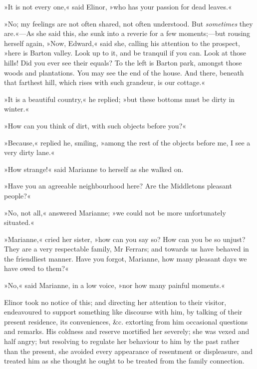 »It is not every one,« said Elinor, »who has your passion for dead leaves.«

»No; my feelings are not often shared, not often understood. But \textit{sometimes} they are.«—As she said this, she sunk into a reverie for a few moments;—but rousing herself again, »Now, Edward,« said she, calling his attention to the prospect, »here is Barton valley. Look up to it, and be tranquil if you can. Look at those hills! Did you ever see their equals? To the left is Barton park, amongst those woods and plantations. You may see the end of the house. And there, beneath that farthest hill, which rises with such grandeur, is our cottage.«

»It is a beautiful country,« he replied; »but these bottoms must be dirty in winter.«

»How can you think of dirt, with such objects before you?«

»Because,« replied he, smiling, »among the rest of the objects before me, I see a very dirty lane.«

»How strange!« said Marianne to herself as she walked on.

»Have you an agreeable neighbourhood here? Are the Middletons pleasant people?«

»No, not all,« answered Marianne; »we could not be more unfortunately situated.«

»Marianne,« cried her sister, »how can you say so? How can you be so unjust? They are a very respectable family, Mr Ferrars; and towards us have behaved in the friendliest manner. Have you forgot, Marianne, how many pleasant days we have owed to them?«

»No,« said Marianne, in a low voice, »nor how many painful moments.«

Elinor took no notice of this; and directing her attention to their visitor, endeavoured to support something like discourse with him, by talking of their present residence, its conveniences, \&c. extorting from him occasional questions and remarks. His coldness and reserve mortified her severely; she was vexed and half angry; but resolving to regulate her behaviour to him by the past rather than the present, she avoided every appearance of resentment or displeasure, and treated him as she thought he ought to be treated from the family connection.